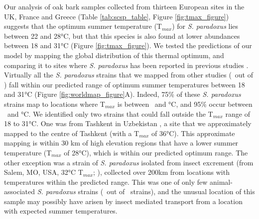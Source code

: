 \documentclass[12pt]{article}
\begin{document}
\begin{linenumbers}
Our analysis of oak bark samples collected from thirteen European sites in the UK, France and Greece (Table \ref{tab:scsp_table}, Figure \ref{fig:tmax_figure}) suggests that the optimum summer temperature (T$_{max}$) for \textit{S. paradoxus} lies between 22 and 28\si{\degreeCelsius}, but that this species is also found at lower abundances between 18 and 31\si{\degreeCelsius} (Figure \ref{fig:tmax_figure}). We tested the predictions of our model by mapping the global distribution of this thermal optimum, and comparing it to sites where \textit{S. paradoxus} has been reported in previous studies \citep{naumov_differentiation_1997,kuehne_allopatric_2007,liti_population_2009,zhang_saccharomyces_2010,leducq_local_2014}. Virtually all the \textit{S. paradoxus} strains that we mapped from other studies (\partmaxok\ out of \parinms) fall within our predicted range of optimum summer temperatures between 18 and 31\si{\degreeCelsius} (Figure \ref{fig:worldmap_figure}A). Indeed, 75\% of these \textit{S. paradoxus} strains map to locations where T$_{max}$ is between \parseventyfivel\ and \parseventyfiveu\si{\degreeCelsius}, and 95\% occur between \parninetyfivel\ and \parninetyfiveu\si{\degreeCelsius}. We identified only two strains that could fall outside the T$_{max}$ range of 18 to 31\si{\degreeCelsius}. One was from Tashkent in Uzbekistan \citep{naumov_differentiation_1997}, a site that we approximately mapped to the centre of Tashkent (with a T$_{max}$ of 36\si{\degreeCelsius}). This approximate mapping is within 30 km of high elevation regions that have a lower summer temperature (T$_{max}$ of 28\si{\degreeCelsius}), which is within our predicted optimum range. The other exception was a strain of \textit{S. paradoxus} isolated from insect excrement (from Salem, MO, USA, 32\si{\degreeCelsius} T$_{max}$; \citealp{leducq_local_2014}), collected over 200km from locations with temperatures within the predicted range. This was one of only few animal-associated \textit{S. paradoxus} strains (\paranimal\ out of \parinms\ strains), and the unusual location of this sample may possibly have arisen by insect mediated transport from a location with expected summer temperatures. 


\end{linenumbers}
\end{document}
